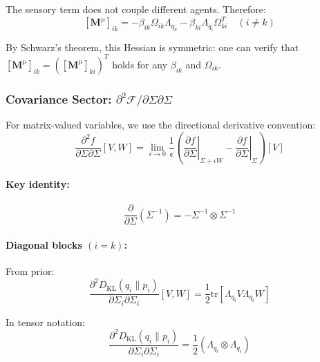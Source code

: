 \documentclass[12pt]{article}
\begin{document}
The sensory term does not couple different agents. Therefore:
\begin{equation}
\boxed{
[\mathbf{M}^\mu]_{ik} = -\beta_{ik}\Omega_{ik}\Lambda_{q_k} - \beta_{ki}\Lambda_{q_i}\Omega_{ki}^T \quad (i \neq k)
}
\label{eq:mass_offdiagonal}
\end{equation}


By Schwarz's theorem, this Hessian is symmetric: one can verify that $[\mathbf{M}^\mu]_{ik} = ([\mathbf{M}^\mu]_{ki})^T$ holds for any $\beta_{ik}$ and $\Omega_{ik}$.


\subsubsection{Covariance Sector: $\partial^2\mathcal{F}/\partial\Sigma\partial\Sigma$}

For matrix-valued variables, we use the directional derivative convention:
\begin{equation}
\frac{\partial^2 f}{\partial \Sigma \partial \Sigma}[V, W] = \lim_{\epsilon \to 0} \frac{1}{\epsilon}\left(\left.\frac{\partial f}{\partial \Sigma}\right|_{\Sigma + \epsilon W} - \left.\frac{\partial f}{\partial \Sigma}\right|_{\Sigma}\right)[V]
\end{equation}

\paragraph{Key identity:}
\begin{equation}
\frac{\partial}{\partial \Sigma}(\Sigma^{-1}) = -\Sigma^{-1} \otimes \Sigma^{-1}
\end{equation}

\paragraph{Diagonal blocks $(i = k)$:}

From prior:
\begin{equation}
\frac{\partial^2 D_{\mathrm{KL}}(q_i \| p_i)}{\partial \Sigma_i \partial \Sigma_i}[V, W] = \frac{1}{2}\mathrm{tr}\left[\Lambda_{q_i}V\Lambda_{q_i}W\right]
\end{equation}

In tensor notation:
\begin{equation}
\frac{\partial^2 D_{\mathrm{KL}}(q_i \| p_i)}{\partial \Sigma_i \partial \Sigma_i} = \frac{1}{2}(\Lambda_{q_i} \otimes \Lambda_{q_i})
\end{equation}
\end{document}
